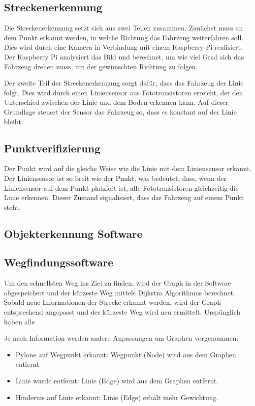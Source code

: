 \documentclass[../main.tex]{subfiles}
\begin{document}
\subsection{Streckenerkennung}
Die Streckenerkennung setzt sich aus zwei Teilen zusammen. Zunächst muss an dem Punkt erkannt werden, in welche Richtung das Fahrzeug weiterfahren soll. Dies wird durch eine Kamera in Verbindung mit einem Raspberry Pi realisiert. Der Raspberry Pi analysiert das Bild und berechnet, um wie viel Grad sich das Fahrzeug drehen muss, um der gewünschten Richtung zu folgen.

Der zweite Teil der Streckenerkennung sorgt dafür, dass das Fahrzeug der Linie folgt. Dies wird durch einen Liniensensor aus Fototransistoren erreicht, der den Unterschied zwischen der Linie und dem Boden erkennen kann. Auf dieser Grundlage steuert der Sensor das Fahrzeug so, dass es konstant auf der Linie bleibt.


\subsection{Punktverifizierung}
Der Punkt wird auf die gleiche Weise wie die Linie mit dem Liniensensor erkannt. Der Liniensensor ist so breit wie der Punkt, was bedeutet, dass, wenn der Liniensensor auf dem Punkt platziert ist, alle Fototransistoren gleichzeitig die Linie erkennen. Dieser Zustand signalisiert, dass das Fahrzeug auf einem Punkt steht.


\subsection{Objekterkennung Software}



\subsection{Wegfindungssoftware}

Um den schnellsten Weg ins Ziel zu finden, wird der Graph in der Software abgespeichert
und der kürzeste Weg mittels Dijkstra Algorithmus berechnet. Sobald neue Informationen der Strecke erkannt werden, wird der Graph entsprechend angepasst und der kürzeste Weg wird neu ermittelt.
Urspünglich haben alle 

Je nach Information werden andere Anpassungen am Graphen vorgenommen:
\begin{itemize}
    \item Pylone auf Wegpunkt erkannt: Wegpunkt (Node) wird aus dem Graphen entfernt
    \item Linie wurde entfernt: Linie (Edge) wird aus dem Graphen entfernt.
    \item Hindernis auf Linie erkannt: Linie (Edge) erhält mehr Gewichtung.
\end{itemize}
\end{document}

